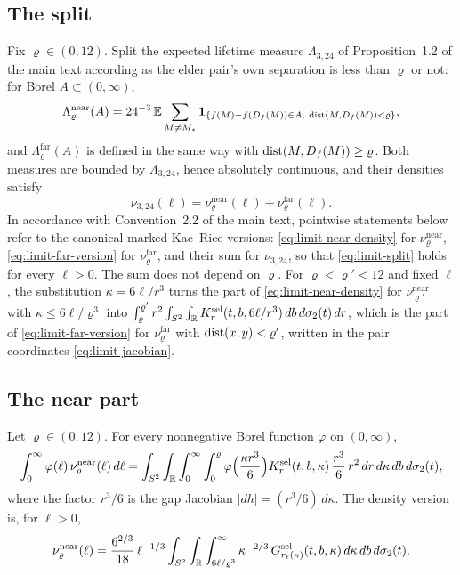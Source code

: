 \subsection*{The split}
Fix $\varrho\in(0,12)$. Split the expected lifetime measure $\Lambda_{3,24}$ of Proposition~1.2 of the main text according as the elder pair's own separation is less than $\varrho$ or not: for Borel $A\subset(0,\infty)$,
\begin{equation}\label{eq:limit-Lambda}
\Lambda^{\mathrm{near}}_\varrho(A)=24^{-3}\,\E\sum_{M\ne M_*}\ind_{\{f(M)-f(D_f(M))\in A,\ \dist(M,D_f(M))<\varrho\}},
\end{equation}
and $\Lambda^{\mathrm{far}}_\varrho(A)$ is defined in the same way with $\operatorname{dist}(M,D_f(M))\ge\varrho$. Both measures are bounded by $\Lambda_{3,24}$, hence absolutely continuous, and their densities satisfy
\begin{equation}\label{eq:limit-split}
\nu_{3,24}(\ell)=\nu^{\mathrm{near}}_\varrho(\ell)+\nu^{\mathrm{far}}_\varrho(\ell).
\end{equation}
In accordance with Convention~2.2 of the main text, pointwise statements below refer to the canonical marked Kac--Rice versions: \eqref{eq:limit-near-density} for $\nu^{\mathrm{near}}_\varrho$, \eqref{eq:limit-far-version} for $\nu^{\mathrm{far}}_\varrho$, and their sum for $\nu_{3,24}$, so that \eqref{eq:limit-split} holds for every $\ell>0$. The sum does not depend on $\varrho$. For $\varrho<\varrho'<12$ and fixed $\ell$, the substitution $\kappa=6\ell/r^3$ turns the part of \eqref{eq:limit-near-density} for $\nu^{\mathrm{near}}_{\varrho'}$ with $\kappa\le6\ell/\varrho^3$ into $\int_\varrho^{\varrho'}r^2\int_{S^2}\int_{\mathbb R}K^{\mathrm{sel}}_r(t,b,6\ell/r^3)\,db\,d\sigma_2(t)\,dr$, which is the part of \eqref{eq:limit-far-version} for $\nu^{\mathrm{far}}_\varrho$ with $\operatorname{dist}(x,y)<\varrho'$, written in the pair coordinates \eqref{eq:limit-jacobian}.

\subsection*{The near part}

\begin{proposition}\label{prop:limit-near}
Let $\varrho\in(0,12)$. For every nonnegative Borel function $\varphi$ on $(0,\infty)$,
\begin{equation}\label{eq:limit-near-measure}
\int_0^\infty\varphi(\ell)\,\nu^{\mathrm{near}}_\varrho(\ell)\,d\ell
=\int_{S^2}\int_{\mathbb R}\int_0^\infty\int_0^\varrho\varphi\Bigl(\frac{\kappa r^3}{6}\Bigr)K^{\mathrm{sel}}_r(t,b,\kappa)\,\frac{r^3}{6}\,r^2\,dr\,d\kappa\,db\,d\sigma_2(t),
\end{equation}
where the factor $r^3/6$ is the gap Jacobian $|dh|=(r^3/6)\,d\kappa$. The density version is, for $\ell>0$,
\begin{equation}\label{eq:limit-near-density}
\nu^{\mathrm{near}}_\varrho(\ell)=\frac{6^{2/3}}{18}\,\ell^{-1/3}\int_{S^2}\int_{\mathbb R}\int_{6\ell/\varrho^3}^{\infty}\kappa^{-2/3}\,G^{\mathrm{sel}}_{r_\ell(\kappa)}(t,b,\kappa)\,d\kappa\,db\,d\sigma_2(t).
\end{equation}
\end{proposition}

